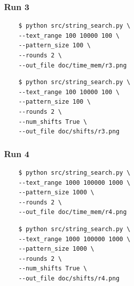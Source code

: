 \documentclass[11pt, letterpaper]{article}
\begin{document}
\subsubsection{Run 3}
\begin{verbatim}
    $ python src/string_search.py \
    --text_range 100 10000 100 \
    --pattern_size 100 \
    --rounds 2 \
    --out_file doc/time_mem/r3.png
\end{verbatim}
\begin{verbatim}
    $ python src/string_search.py \
    --text_range 100 10000 100 \
    --pattern_size 100 \
    --rounds 2 \
    --num_shifts True \
    --out_file doc/shifts/r3.png
\end{verbatim}

\subsubsection{Run 4}
\begin{verbatim}
    $ python src/string_search.py \
    --text_range 1000 100000 1000 \
    --pattern_size 1000 \
    --rounds 2 \
    --out_file doc/time_mem/r4.png
\end{verbatim}
\begin{verbatim}
    $ python src/string_search.py \
    --text_range 1000 100000 1000 \
    --pattern_size 1000 \
    --rounds 2 \
    --num_shifts True \
    --out_file doc/shifts/r4.png
\end{verbatim}


{}

\end{document}
